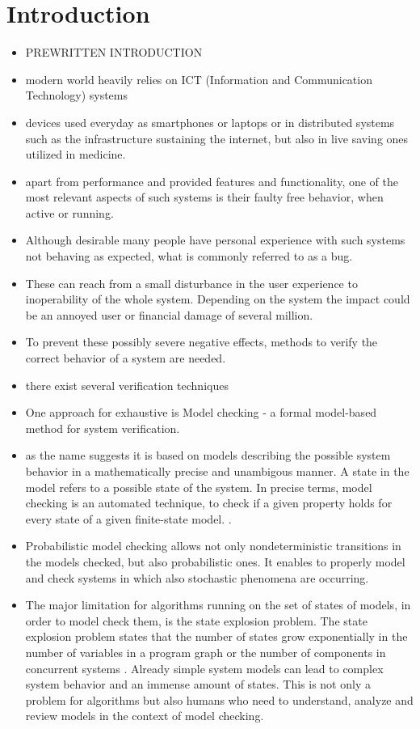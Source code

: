 \documentclass[preview]{standalone}
\begin{document}
\section{Introduction}

\begin{itemize}
	\item PREWRITTEN INTRODUCTION
	\item modern world heavily relies on ICT (Information and Communication Technology) systems
	\item {} devices used everyday as smartphones or laptops or in distributed systems such as the infrastructure sustaining the internet, but also in live saving ones utilized in medicine.
	\item apart from performance and provided features and functionality, one of the most relevant aspects of such systems is their faulty free behavior, when active or running.
	\item Although desirable many people have personal experience with such systems not behaving as expected, what is commonly referred to as a bug.
	\item These can reach from a small disturbance in the user experience to inoperability of the whole system. Depending on the system the impact could be an annoyed user or financial damage of several million.
	\item To prevent these possibly severe negative effects, methods to verify the correct behavior of a system are needed.
	\item there exist several verification techniques
	\item One approach for exhaustive is Model checking - a formal model-based method for system verification.
	\item as the name suggests it is based on models describing the possible system behavior in a mathematically precise and unambigous manner. A state in the model refers to a possible state of the system. In precise terms, model checking is an automated technique, to check if a given property holds for every state of a given finite-state model. \cite[chs. 1.1 and 1.2]{Baier2008}.
	\item Probabilistic model checking allows not only nondeterministic transitions in the models checked, but also probabilistic ones. It enables to properly model and check systems in which also stochastic phenomena are occurring. 
	\item The major limitation for algorithms running on the set of states of models, in order to model check them, is the state explosion problem. The state explosion problem states that the number of states grow exponentially in the number of variables in a program graph or the number of components in concurrent systems \cite[ch. 2.3]{Baier2008}. Already simple system models can lead to complex system behavior and an immense amount of states. This is not only a problem for algorithms but also humans who need to understand, analyze and review models in the context of model checking.

\end{itemize}
\end{document}

